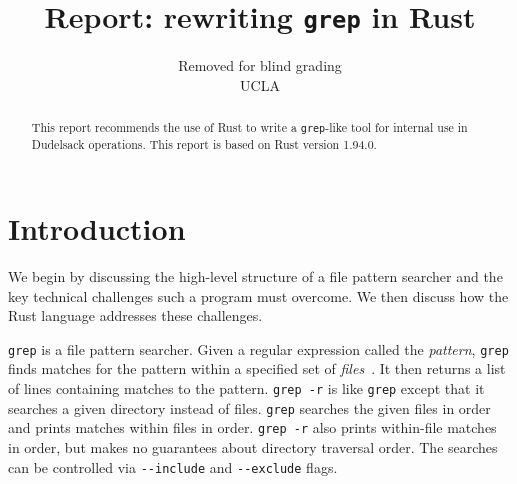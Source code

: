 \documentclass[letterpaper,twocolumn,10pt]{article}
\newcommand{\grep}{\texttt{grep}}
\newcommand{\grepr}{\texttt{grep -r}}
\begin{document}

\date{}

\title{\Large \bf Report: rewriting \texttt{grep} in Rust}

\author{
{Removed for blind grading}\\
UCLA
} %

\maketitle

\vspace{-5em}

\begin{abstract}
This report recommends the use of Rust to write a \grep{}-like tool for internal use in Dudelsack operations.
This report is based on Rust version 1.94.0.
\end{abstract}


\section{Introduction}

We begin by discussing the high-level structure of a file pattern searcher and the key technical challenges such a program must overcome.
We then discuss how the Rust language addresses these challenges.

\grep{} is a file pattern searcher.
Given a regular expression called the \emph{pattern}, \grep{} finds matches for the pattern within a specified set of \emph{files}~\cite{grepManPage}.
It then returns a list of lines containing matches to the pattern.
\grepr{} is like \grep{} except that it searches a given directory instead of files.
\grep{} searches the given files in order and prints matches within files in order.
\grepr{} also prints within-file matches in order, but makes no guarantees about directory traversal order.
The searches can be controlled via \verb|--include| and \verb|--exclude| flags.
\end{document}
